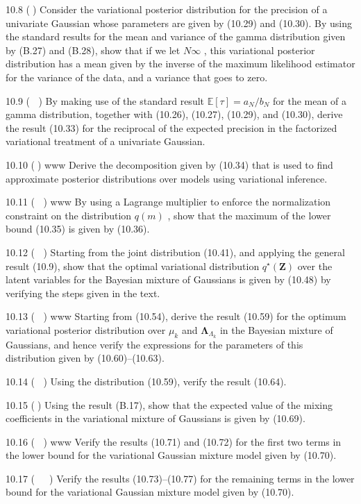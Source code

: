 \documentclass[
  10
]{article}
\begin{document}
10.8 () Consider the variational posterior distribution for the
precision of a univariate Gaussian whose parameters are given by (10.29)
and (10.30). By using the standard results for the mean and variance of
the gamma distribution given by (B.27) and (B.28), show that if we let
\(N  \infty\) , this variational posterior distribution has a mean given
by the inverse of the maximum likelihood estimator for the variance of
the data, and a variance that goes to zero.

10.9 ( ) By making use of the standard result
\(\mathbb { E } [ \tau ] = a _ { N } / b _ { N }\) for the mean of a
gamma distribution, together with (10.26), (10.27), (10.29), and
(10.30), derive the result (10.33) for the reciprocal of the expected
precision in the factorized variational treatment of a univariate
Gaussian.

10.10 () www Derive the decomposition given by (10.34) that is used to
find approximate posterior distributions over models using variational
inference.

10.11 ( ) www By using a Lagrange multiplier to enforce the
normalization constraint on the distribution \(q ( m )\) , show that the
maximum of the lower bound (10.35) is given by (10.36).

10.12 ( ) Starting from the joint distribution (10.41), and applying the
general result (10.9), show that the optimal variational distribution
\(q ^ { \star } ( \mathbf { Z } )\) over the latent variables for the
Bayesian mixture of Gaussians is given by (10.48) by verifying the steps
given in the text.

10.13 ( ) www Starting from (10.54), derive the result (10.59) for the
optimum variational posterior distribution over \(\mu _ { k }\) and
\(\mathbf { \Lambda } _ { \Lambda _ { k } }\) in the Bayesian mixture of
Gaussians, and hence verify the expressions for the parameters of this
distribution given by (10.60)--(10.63).

10.14 ( ) Using the distribution (10.59), verify the result (10.64).

10.15 () Using the result (B.17), show that the expected value of the
mixing coefficients in the variational mixture of Gaussians is given by
(10.69).

10.16 ( ) www Verify the results (10.71) and (10.72) for the first two
terms in the lower bound for the variational Gaussian mixture model
given by (10.70).

10.17 (  ) Verify the results (10.73)--(10.77) for the remaining terms
in the lower bound for the variational Gaussian mixture model given by
(10.70).
\end{document}

